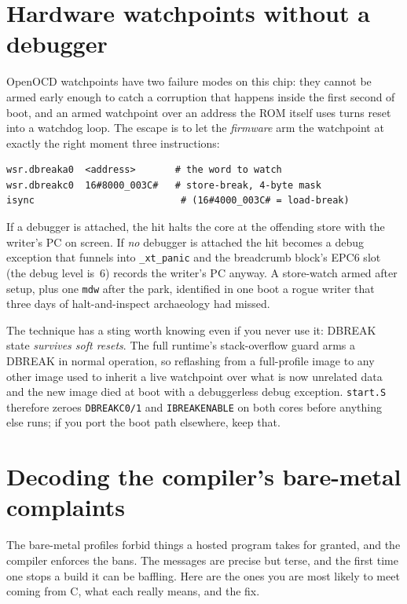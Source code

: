 \section{Hardware watchpoints without a debugger}

OpenOCD watchpoints have two failure modes on this chip: they cannot be armed
early enough to catch a corruption that happens inside the first second of
boot, and an armed watchpoint over an address the ROM itself uses turns reset
into a watchdog loop.  The escape is to let the \emph{firmware} arm the
watchpoint at exactly the right moment \textemdash{} three instructions:

\begin{lstlisting}[style=sh]
wsr.dbreaka0  <address>       # the word to watch
wsr.dbreakc0  16#8000_003C#   # store-break, 4-byte mask
isync                          # (16#4000_003C# = load-break)
\end{lstlisting}

If a debugger is attached, the hit halts the core at the offending store with
the writer's PC on screen.  If \emph{no} debugger is attached the hit becomes
a debug exception that funnels into \texttt{\_xt\_panic} \textemdash{} and
the breadcrumb block's EPC6 slot (the debug level is~6) records the writer's
PC anyway.  A store-watch armed after setup, plus one \texttt{mdw} after the
park, identified in one boot a rogue writer that three days of halt-and-inspect
archaeology had missed.

The technique has a sting worth knowing even if you never use it: DBREAK state
\emph{survives soft resets}.  The full runtime's stack-overflow guard arms a
DBREAK in normal operation, so reflashing from a full-profile image to any
other image used to inherit a live watchpoint over what is now unrelated data
\textemdash{} and the new image died at boot with a debuggerless debug
exception.  \texttt{start.S} therefore zeroes \texttt{DBREAKC0/1} and
\texttt{IBREAKENABLE} on both cores before anything else runs; if you port the
boot path elsewhere, keep that.

\section{Decoding the compiler's bare-metal complaints}

The bare-metal profiles forbid things a hosted program takes for granted, and the
compiler enforces the bans. The messages are precise but terse, and the first time
one stops a build it can be baffling. Here are the ones you are most likely to meet
coming from C, what each really means, and the fix.

